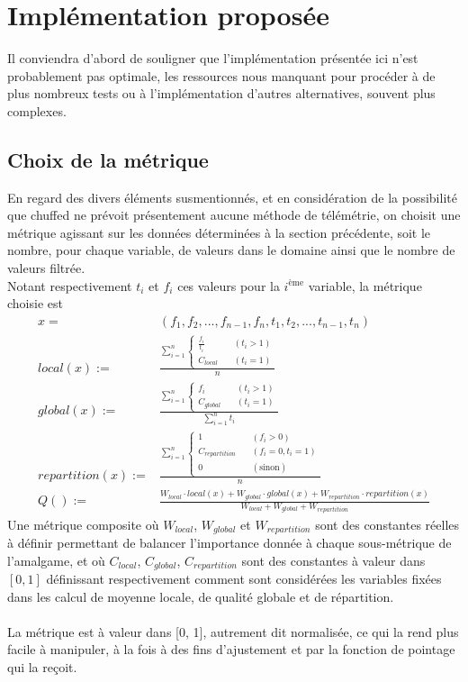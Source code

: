 \documentclass{article}
\begin{document}
\section{Implémentation proposée}
Il conviendra d'abord de souligner que l'implémentation présentée ici n'est
probablement pas optimale, les ressources nous manquant pour procéder à de
plus nombreux tests ou à l'implémentation d'autres alternatives, souvent
plus complexes. \\
\subsection{Choix de la métrique}
En regard des divers éléments susmentionnés, et en considération de la
possibilité que chuffed ne prévoit présentement aucune méthode de télémétrie,
on choisit une métrique agissant sur les données déterminées à la section
précédente, soit le nombre, pour chaque variable, de valeurs dans le domaine
ainsi que le nombre de valeurs filtrée. \\
Notant respectivement $t_i$ et $f_i$ ces valeurs pour la $i^\text{ème}$
variable, la métrique choisie est
\begin{equation*}
\begin{split}
	x =& (f_1, f_2, ..., f_{n-1}, f_n, t_1, t_2, ..., t_{n-1}, t_n) \\
	local(x) :=& \frac{\sum_{i = 1}^{n}
	\begin{cases}
		\frac{f_i}{t_i} \quad &(t_i > 1)\\ C_{local} \quad &(t_i = 1)
	\end{cases}}{n} \\
	global(x) :=& \frac{\sum_{i = 1}^{n}\begin{cases}
		f_i \quad &(t_i > 1) \\ C_{global} \quad &(t_i = 1)
	\end{cases}}{\sum_{i = 1}^{n}t_i} \\
	repartition(x) :=& \frac{\sum_{i = 1}^{n}\begin{cases}
		1 \quad &(f_i > 0) \\
		C_{repartition} \quad &(f_i = 0, t_i = 1) \\
		0 \quad &(\text{sinon})
	\end{cases}}{n} \\
	Q() :=& \frac{
	  W_{local} \cdot local(x)
	+ W_{global} \cdot global(x)
	+ W_{repartition} \cdot repartition(x)
	}{W_{local} + W_{global} + W_{repartition}}
\end{split}
\end{equation*}
Une métrique composite où $W_{local}$, $W_{global}$ et $W_{repartition}$
sont des constantes réelles à définir permettant de balancer l'importance
donnée à chaque sous-métrique de l'amalgame, et où $C_{local}$,
$C_{global}$, $C_{repartition}$ sont des constantes à valeur dans $[0, 1]$
définissant respectivement comment sont considérées les variables fixées
dans les calcul de moyenne locale, de qualité globale et de répartition. \\
\\
La métrique est à valeur dans [0, 1], autrement dit normalisée, ce qui
la rend plus facile à manipuler, à la fois à des fins d'ajustement et
par la fonction de pointage qui la reçoit.
\end{document}
